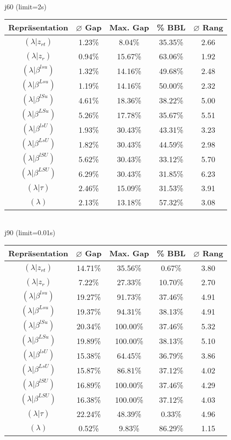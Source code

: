 \documentclass{scrartcl}
\begin{document}
\\[8pt]j60 (limit=2s)\\\begin{tabular}{ccccc}
\hline
Repräsentation & $\varnothing$ Gap & Max. Gap & \% BBL & $\varnothing$ Rang\\[3pt]
\hline
$(\lambda|z_{rt})$&1.23\%&8.04\%&35.35\%&2.66\\
\hline
$(\lambda|z_r)$&0.94\%&15.67\%&63.06\%&1.92\\
\hline
$(\lambda|\beta^{lsu})$&1.32\%&14.16\%&49.68\%&2.48\\
\hline
$(\lambda|\beta^{Lsu})$&1.19\%&14.16\%&50.00\%&2.32\\
\hline
$(\lambda|\beta^{lSu})$&4.61\%&18.36\%&38.22\%&5.00\\
\hline
$(\lambda|\beta^{LSu})$&5.26\%&17.78\%&35.67\%&5.51\\
\hline
$(\lambda|\beta^{lsU})$&1.93\%&30.43\%&43.31\%&3.23\\
\hline
$(\lambda|\beta^{LsU})$&1.82\%&30.43\%&44.59\%&2.98\\
\hline
$(\lambda|\beta^{lSU})$&5.62\%&30.43\%&33.12\%&5.70\\
\hline
$(\lambda|\beta^{LSU})$&6.29\%&30.43\%&31.85\%&6.23\\
\hline
$(\lambda|\tau)$&2.46\%&15.09\%&31.53\%&3.91\\
\hline
$(\lambda)$&2.13\%&13.18\%&57.32\%&3.08\\\hline
\end{tabular}
\\[8pt]
\newpage
j90 (limit=0.01s)\\\begin{tabular}{ccccc}
\hline
Repräsentation & $\varnothing$ Gap & Max. Gap & \% BBL & $\varnothing$ Rang\\[3pt]
\hline
$(\lambda|z_{rt})$&14.71\%&35.56\%&0.67\%&3.80\\
\hline
$(\lambda|z_r)$&7.22\%&27.33\%&10.70\%&2.70\\
\hline
$(\lambda|\beta^{lsu})$&19.27\%&91.73\%&37.46\%&4.91\\
\hline
$(\lambda|\beta^{Lsu})$&19.37\%&94.31\%&38.13\%&4.91\\
\hline
$(\lambda|\beta^{lSu})$&20.34\%&100.00\%&37.46\%&5.32\\
\hline
$(\lambda|\beta^{LSu})$&19.89\%&100.00\%&38.13\%&5.10\\
\hline
$(\lambda|\beta^{lsU})$&15.38\%&64.45\%&36.79\%&3.86\\
\hline
$(\lambda|\beta^{LsU})$&15.87\%&86.81\%&37.12\%&4.02\\
\hline
$(\lambda|\beta^{lSU})$&16.89\%&100.00\%&37.46\%&4.29\\
\hline
$(\lambda|\beta^{LSU})$&16.38\%&100.00\%&37.12\%&4.03\\
\hline
$(\lambda|\tau)$&22.24\%&48.39\%&0.33\%&4.96\\
\hline
$(\lambda)$&0.52\%&9.83\%&86.29\%&1.15\\\hline
\end{tabular}
\end{document}
